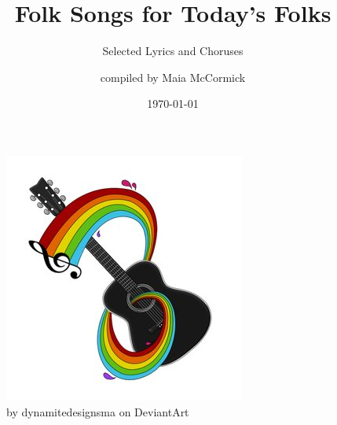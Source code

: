 \documentclass[twoside,16pt,openany,letterpaper]{memoir}%
\title{Folk Songs for Today's Folks}
\subtitle{Selected Lyrics and Choruses}
\author{compiled by Maia McCormick}
\date{\today}
\begin{document}
\maketitle

\vspace*{\fill}
\begin{figure}[h]
\centering
\includegraphics[scale=1.4]{coverImg}
\caption{by dynamitedesignsma on DeviantArt}
\end{figure}
\vspace*{\fill}
\clearpage

\begin{KeepFromToc}
  \tableofcontents
\end{KeepFromToc}
\clearpage

\end{document}
